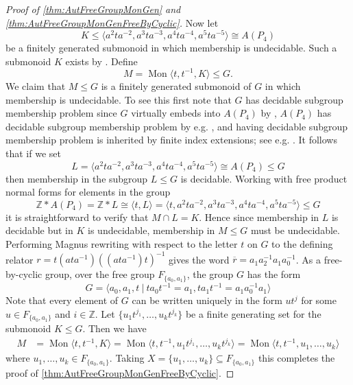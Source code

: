 \documentclass[11pt]{amsart}
\newcommand{\Mgen}[1]{\operatorname{Mon}\bigl\langle #1 \bigr\rangle}
\newcommand{\Ggen}[1]{\bigl\langle #1 \bigr\rangle}
\newcommand{\Gpres}[2]{\bigl\langle #1\:|\:#2 \bigr\rangle}
\newcommand{\Z}{\mathbb{Z}}
\theoremstyle{plain}
\theoremstyle{definition}
\begin{document}
\begin{proof}[Proof of \cref{thm:AutFreeGroupMonGen} and \cref{thm:AutFreeGroupMonGenFreeByCyclic}]
Now let 
\[
K \leq \Ggen{a^2 t a^{-2}, a^3 t a^{-3}, a^4 t a^{-4}, a^5 t a^{-5}} \cong A(P_4)
\] 
be a finitely generated submonoid in which membership is undecidable. Such a submonoid $K$ exists by \cite[Theorem~7]{lohrey2008submonoid}. Define 
\[
M = \Mgen{t, t^{-1}, K} \leq G. 
\]
We claim that $M \leq G$ is a finitely generated submonoid of $G$ in which membership is undecidable.
To see this first note that $G$ has decidable subgroup membership problem since $G$ virtually embeds into $A(P_4)$ by \cite[proof of Theorem~1.2]{niblo2001}, $A(P_4)$ has decidable subgroup membership problem by e.g. \cite{kapovich2005foldings}, and having decidable subgroup membership problem is inherited by finite index extensions; see e.g. \cite{lohrey2008submonoid}. It follows that if we set  
\[
L = \Ggen{a^2 t a^{-2}, a^3 t a^{-3}, a^4 t a^{-4}, a^5 t a^{-5}} \cong A(P_4) \leq G
\]   
then membership in the subgroup $L \leq G$ is decidable.  
Working with free product normal forms for elements in the group 
\[
\Z \ast A(P_4)  = \Z \ast L \cong 
  \Ggen{t,L} =
\langle  t, a^2 t a^{-2}, a^3 t a^{-3}, a^4 t a^{-4}, a^5 t a^{-5} \rangle 
\leq G 
\]
it is straightforward to verify that 
$M \cap L = K$.
Hence since membership in $L$ is decidable but in $K$ is undecidable, membership in $M \leq G$ must be undecidable. Performing Magnus rewriting with respect to the letter $t$ on $G$  to the defining relator
$r = t(ata^{-1})((ata^{-1})t)^{-1}$ 
gives the word $\overline{r} = a_1 a_2^{-1} a_1 a_0^{-1}$.
As a free-by-cyclic group,  over the free group $F_{ \{ a_0,a_1 \}}$, the group 
$G$ has the form 
\[
G = \Gpres{a_0, a_1, t}{ta_0t^{-1} = a_1, ta_1 t^{-1} = a_1 a_0^{-1} a_1}
\]
Note that every element of $G$ can be written uniquely in the form $u t^j$ for some $u \in F_{\{ a_0, a_1 \}}$ and $i \in \Z$. Let $\{ u_1 t^{j_1}, \ldots, u_k t^{j_k} \}$ be a finite generating set for the submonoid $K \leq G$. Then we have 
\begin{align*} 
M 
&= \Mgen{t, t^{-1}, K} 
= \Mgen{t, t^{-1}, u_1 t^{j_1}, \ldots, u_k t^{j_k} } 
= \Mgen{t, t^{-1}, u_1, \ldots, u_k } 
  \end{align*}
where $u_1, \ldots, u_k \in F_{\{ a_0,a_1 \}}$. Taking $X = \{u_1, \ldots, u_k \} \subseteq F_{\{ a_0,a_1 \}}$ this completes the proof of  \cref{thm:AutFreeGroupMonGenFreeByCyclic}. 


\end{proof}
\end{document}
